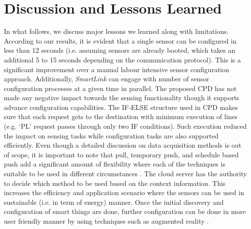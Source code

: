 \documentclass[graybox]{svmult}
\begin{document}
\section{Discussion and Lessons Learned}
\label{sec:Discussion}
In what follows, we discuss major lessons we learned along with limitations. According to our results, it is evident that a single sensor can be configured in less than 12 seconds (i.e. assuming sensors are already booted, which takes an additional 5 to 15 seconds depending on the communication protocol). This is a significant improvement over a manual labour intensive sensor configuration approach. Additionally, \textit{SmartLink} can engage with  number of sensor configuration processes at a given time in parallel. The proposed CPD has not made any negative impact towards the sensing functionality though it supports advance configuration capabilities. The IF-ELSE structure used in CPD makes sure that each request gets to the destination with minimum execution of lines (e.g. `PL' request passes through only two IF conditions). Such execution reduced the impact on sensing tasks while configuration tasks are also supported efficiently. Even though a detailed discussion on data acquisition methods is out of scope, it is important to note that pull, temporary push, and schedule based push add a significant amount of flexibility where each of the techniques is suitable to be used in different circumstances \cite{ZMP007}. The cloud server has the authority to decide which method to be used based on the context information. This increases the efficiency and application scenario where the sensors can be used in sustainable (i.e. in term of energy) manner. Once the initial discovery and configuration of smart things are done, further configuration can be done in more user friendly manner by using techniques such as augmented reality \cite{E1}.
\end{document}
